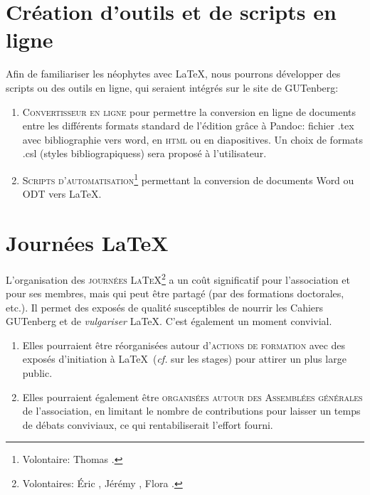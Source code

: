 \documentclass{tufte-handout}
\newcommand{\ratio}[3][]{\marginpar{\footnotesize{\textcolor{teal}{Temps requis: #2 / Utilité: #3}\par\noindent \textcolor{teal}{#1}}}}
\begin{document}
\section{Création d'outils et de scripts en ligne}

Afin de familiariser les néophytes avec \LaTeX\ratio[Petites contributions, par les connaisseurs]{++}{+++}, nous pourrons développer des scripts ou des outils en ligne, qui seraient intégrés sur le site de GUTenberg:

\begin{enumerate}
	\item\textsc{Convertisseur en ligne} pour permettre la conversion en ligne de documents entre les différents formats standard de l'édition grâce à Pandoc: fichier .tex avec bibliographie vers word, en \textsc{html} ou en diapositives. Un choix de formats .csl (styles bibliograpiquess) sera  proposé à l'utilisateur.
	\item\textsc{Scripts d'automatisation}\footnote{Volontaire: Thomas .} permettant la conversion de documents Word ou ODT vers \LaTeX.
\end{enumerate}


\section{Journées \LaTeX}

L'organisation des \textsc{journées \LaTeX}\ratio[Coûteuses, mais utiles et susceptibles de s'intégrer dans les autres projets]{+++}{+++}\footnote{Volontaires: Éric , Jérémy , Flora .} a un coût significatif pour l'association et pour ses membres, mais qui peut être partagé (par des formations doctorales, etc.). Il permet des exposés de qualité susceptibles de nourrir les Cahiers GUTenberg et de \emph{vulgariser} \LaTeX. C'est également un moment convivial.

\begin{enumerate}
	\item Elles pourraient être réorganisées autour d'\textsc{actions de formation} avec des exposés d'initiation à \LaTeX\ (\emph{cf.} sur les stages) pour attirer un plus large public.
	\item Elles pourraient également être \textsc{organisées autour des Assemblées générales} de l'association, en limitant le nombre de contributions pour laisser un temps de débats conviviaux, ce qui rentabiliserait l'effort fourni.
\end{enumerate}
\end{document}
